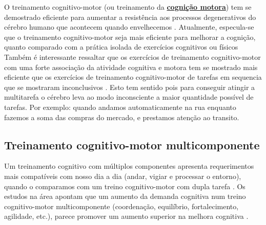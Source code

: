 O treinamento cognitivo-motor (ou treinamento da \hyperref[def:cognitivo-motor]{\textbf{cognição motora}}) 
tem se demostrado eficiente para aumentar a resistência aos processos degenerativos do cérebro humano que acontecem quando envelhecemos \cite[pp. 22]{variseefeitos}.
Atualmente, especula-se que o treinamento cognitivo-motor seja mais eficiente para melhorar a cognição, 
quanto comparado com a prática isolada de exercícios cognitivos ou físicos 
\cite{wollesen2020effects} \cite[pp. 22]{variseefeitos}
Também é interessante ressaltar que os exercícios de treinamento cognitivo-motor com 
uma forte associação da atividade cognitiva e motora
tem se mostrado mais eficiente que os exercícios de treinamento cognitivo-motor de tarefas em sequencia 
que se mostraram inconclusivos
\cite{wollesen2020effects} \cite[pp. 22]{variseefeitos}. 
Esto tem sentido pois para conseguir atingir a multitarefa o cérebro leva
ao modo inconsciente a maior quantidade possível de tarefas. 
Por exemplo: quando andamos automaticamente na rua enquanto fazemos a soma das compras do mercado,
e prestamos atenção ao transito.

\subsection{Treinamento cognitivo-motor multicomponente}
\label{subsec:sec-motor-cognitive-multicomponente}
Um treinamento cognitivo com múltiplos componentes apresenta requerimentos mais compatíveis 
com nosso dia a dia (andar, vigiar e processar o entorno), 
quando o comparamos com um treino cognitivo-motor com dupla tarefa
\cite[pp. 23]{variseefeitos}. 
Os estudos na área apontam que um aumento da demanda cognitiva num treino cognitivo-motor multicomponente 
(coordenação, equilíbrio, fortalecimento, agilidade, etc.), 
parece promover um aumento superior na melhora cognitiva
\cite[pp. 24]{variseefeitos} \cite[pp. 44]{biehl2016pratica} \cite{medeiros2018impacto}. 

